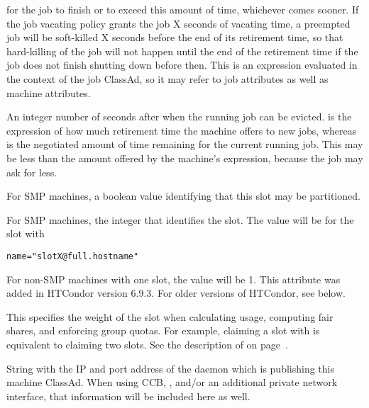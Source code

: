 \begin{description}
for the job to finish or to exceed this amount of time, whichever
comes sooner.  If the job vacating policy grants the job X seconds
of vacating time, a preempted job will be soft-killed X seconds
before the end of its retirement time, so that hard-killing of the
job will not happen until the end of the retirement time if the job
does not finish shutting down before then.  This is an expression
evaluated in the context of the job ClassAd, so it may refer to job
attributes as well as machine attributes.
%
\item[\AdAttr{RetirementTimeRemaining}:] An integer number of seconds
after  when the running job can be evicted.
 is the expression of how much retirement
time the machine offers to new jobs, whereas 
is the negotiated amount of time remaining for the current running
job.  This may be less than the amount offered by the machine's
 expression, because the job may
ask for less.
%
\label{PartitionableSlot-machine-attribute} 
\item[\AdAttr{PartitionableSlot}:] For SMP machines,
a boolean value identifying that this slot may be partitioned.
%
\item[\AdAttr{SlotID}:] For SMP machines, the integer
that identifies the slot.
The value will be \verb@X@ for the slot with 
\begin{verbatim}
name="slotX@full.hostname"
\end{verbatim}
For non-SMP machines with one slot, the value will be 1.
\Note This attribute was added in HTCondor version 6.9.3.
For older versions of HTCondor, see  below.
%
\item[\AdAttr{SlotWeight}:]
  This specifies the weight of the slot when
  calculating usage, computing fair shares, and enforcing group
  quotas.  For example, claiming a slot with  is
  equivalent to claiming two  slots.
  See the description of  on
  page~\pageref{param:SlotWeight}.

%
\item[\AdAttr{StartdIpAddr}:] String with the IP and port address of the
 daemon which is publishing this machine ClassAd.
When using CCB, , and/or an additional private
network interface, that information will be included here as well.


\end{description}
